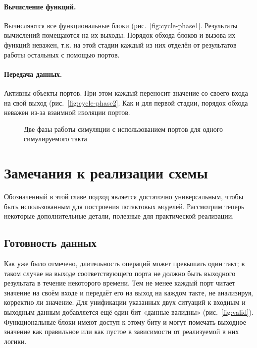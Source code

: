 \paragraph{Вычисление функций.} Вычисляются все функциональные блоки (рис.~\ref{fig:cycle-phase1}. Результаты вычислений помещаются на их выходы. Порядок обхода блоков и вызова их функций неважен, т.к. на этой стадии каждый из них отделён от результатов работы остальных с помощью портов.

\paragraph{Передача данных.} Активны объекты портов. При этом каждый переносит значение со своего входа на свой выход (рис.~\ref{fig:cycle-phase2}. Как и для первой стадии, порядок обхода неважен из-за взаимной изоляции портов.

\begin{figure}[htbp]
\centering
{}
\caption[Две фазы работы потактовой симуляции с использованием портов]{Две фазы работы симуляции с использованием портов для одного симулируемого такта}
\end{figure}


\section{Замечания к реализации схемы}

Обозначенный в этой главе подход является достаточно универсальным, чтобы быть использованным для построения потактовых моделей. Рассмотрим теперь  некоторые дополнительные детали, полезные для практической реализации.

\subsection{Готовность данных}

Как уже было отмечено, длительность операций может превышать один такт; в таком случае на выходе соответствующего порта не должно быть выходного результата в течение некоторого времени. Тем не менее каждый порт читает значение на своём входе и передаёт его на выход на каждом такте, не анализируя, корректно ли значение. Для унификации указанных двух ситуаций к входным и выходным данным добавляется ещё один бит «данные валидны» (рис.~\ref{fig:valid}). Функциональные блоки имеют доступ к этому биту и могут помечать выходное значение как правильное или как пустое в зависимости от реализуемой в них логики.

